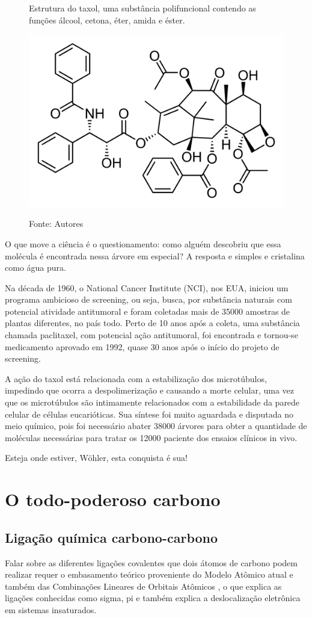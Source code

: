 \documentclass[a4paper,12pt]{book}
\begin{document}
\begin{figure}[h]
	\centering
	\caption{Estrutura do taxol, uma substância polifuncional contendo as funções álcool, cetona, éter, amida e éster.}
	\includegraphics[width=0.3\linewidth]{imagens/Taxol.svg.png} 
	\label{fig:taxol}
	\caption*{Fonte: Autores}
\end{figure}


O que move a ciência é o questionamento: como alguém descobriu que essa molécula é encontrada nessa árvore em especial? A resposta e simples e cristalina como água pura.

Na década de 1960, o National Cancer Institute (NCI), nos EUA, iniciou um programa ambicioso de screening, ou seja, busca, por substância naturais com potencial atividade antitumoral e foram coletadas mais de 35000 amostras de plantas diferentes, no país todo. Perto de 10 anos após a coleta, uma substância chamada paclitaxel, com potencial ação antitumoral, foi encontrada e tornou-se medicamento aprovado em 1992, quase 30 anos após o início do projeto de screening.

A ação do taxol está relacionada com a estabilização dos microtúbulos, impedindo que ocorra a despolimerização e causando a morte celular, uma vez que os microtúbulos são intimamente relacionados com a estabilidade da parede celular de células eucarióticas. Sua síntese foi muito aguardada e disputada no meio químico, pois foi necessário abater 38000 árvores para obter a quantidade de moléculas necessárias para tratar os 12000 paciente dos ensaios clínicos in vivo.

Esteja onde estiver, Wöhler, esta conquista é sua!

\part{O todo-poderoso carbono}

\chapter{Ligação química carbono-carbono}
Falar sobre as diferentes ligações covalentes que dois átomos de carbono podem realizar requer o embasamento teórico proveniente do Modelo Atômico atual e também das Combinações Lineares de Orbitais Atômicos , o que explica as ligações conhecidas como sigma, pi e também explica a deslocalização eletrônica em sistemas insaturados.
\end{document}
